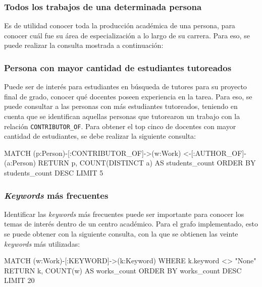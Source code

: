 \documentclass[journal]{IEEEtran}
\begin{document}
\subsubsection{Todos los trabajos de una determinada persona}
Es de utilidad conocer toda la producción académica de una persona, para conocer cuál fue su área de especialización a lo largo de su carrera. Para eso, se puede realizar la consulta mostrada a continuación:


\subsubsection{Persona con mayor cantidad de estudiantes tutoreados}
Puede ser de interés para estudiantes en búsqueda de tutores para su proyecto final de grado, conocer qué docentes poseen experiencia en la tarea. Para eso, se puede consultar a las personas con más estudiantes tutoreados, teniendo en cuenta que se identifican aquellas personas que tutorearon un trabajo con la relación \texttt{CONTRIBUTOR\_OF}. Para obtener el top cinco de docentes con mayor cantidad de estudiantes, se debe realizar la siguiente consulta:

\begin{sflisting}[style=sparql,caption= Docentes con mayor cantidad de estudiantes tutoreados,label=docentes_con_mas_estudiantes]
	MATCH (p:Person)-[:CONTRIBUTOR_OF]->(w:Work)
	<-[:AUTHOR_OF]-(a:Person)
	RETURN p, COUNT(DISTINCT a) AS students_count
	ORDER BY students_count DESC
	LIMIT 5
\end{sflisting}

\subsubsection{\textit{Keywords} más frecuentes}
Identificar las \textit{keywords} más frecuentes puede ser importante para conocer los temas de interés dentro de un centro académico. Para el grafo implementado, esto se puede obtener con la siguiente consulta, con la que se obtienen las veinte \textit{keywords} más utilizadas:

\begin{sflisting}[style=sparql,caption= \textit{Keywords} más frecuentes,label=keywords]
	MATCH (w:Work)-[:KEYWORD]->(k:Keyword)
	WHERE k.keyword <> "None"
	RETURN k, COUNT(w) AS works_count
	ORDER BY works_count DESC
	LIMIT 20
\end{sflisting}
\end{document}
